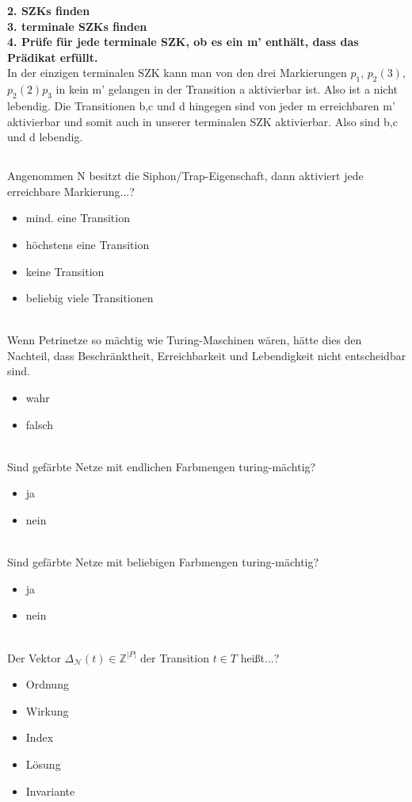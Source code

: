 \documentclass[a4paper,12pt]{scrartcl}
\begin{document}
\textbf{2. SZKs finden}\\
\textbf{3. terminale SZKs finden}\\
\textbf{4. Prüfe für jede terminale SZK, ob es ein m' enthält, dass das Prädikat erfüllt.} \\
In der einzigen terminalen SZK kann man von den drei Markierungen $p_1$, $p_2 (3)$,$p_2 (2)p_3$ in kein m' gelangen in der Transition a aktivierbar ist. Also ist a nicht lebendig. Die Transitionen b,c und d hingegen sind von jeder m erreichbaren m' aktivierbar und somit auch in unserer terminalen SZK aktivierbar. Also sind b,c und d lebendig.
\subsection{}
\subsection{}
Angenommen N besitzt die Siphon/Trap-Eigenschaft, dann aktiviert jede erreichbare Markierung...?
\begin{itemize}
\item{mind. eine Transition}
\item{höchstens eine Transition}
\item{keine Transition}
\item{beliebig viele Transitionen}
\end{itemize}\\
Wenn Petrinetze so mächtig wie Turing-Maschinen wären, hätte dies den Nachteil, dass Beschränktheit, Erreichbarkeit und Lebendigkeit nicht entscheidbar sind.
\begin{itemize}
\item{wahr}
\item{falsch}
\end{itemize}\\
Sind gefärbte Netze mit endlichen Farbmengen turing-mächtig?
\begin{itemize}
\item{ja}
\item{nein}
\end{itemize}\\
Sind gefärbte Netze mit beliebigen Farbmengen turing-mächtig?
\begin{itemize}
\item{ja}
\item{nein}
\end{itemize}\\
Der Vektor $\Delta_{\mathcal{N}}(t)\in \mathds{Z}^{|P|}$ der Transition $t\in T$ heißt...?
\begin{itemize}
\item{Ordnung}
\item{Wirkung}
\item{Index}
\item{Lösung}
\item{Invariante}
\end{itemize}\\
\end{document}
